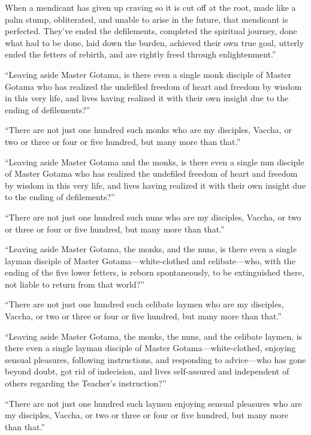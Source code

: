 \documentclass[12pt,openany]{book}%
\begin{document}
When a mendicant has given up craving so it is cut off at the root, made like a palm stump, obliterated, and unable to arise in the future, that mendicant is perfected. They’ve ended the defilements, completed the spiritual journey, done what had to be done, laid down the burden, achieved their own true goal, utterly ended the fetters of rebirth, and are rightly freed through enlightenment.” 

“Leaving aside Master Gotama, is there even a single monk disciple of Master Gotama who has realized the undefiled freedom of heart and freedom by wisdom in this very life, and lives having realized it with their own insight due to the ending of defilements?” 

“There are not just one hundred such monks who are my disciples, Vaccha, or two or three or four or five hundred, but many more than that.” 

“Leaving aside Master Gotama and the monks, is there even a single nun disciple of Master Gotama who has realized the undefiled freedom of heart and freedom by wisdom in this very life, and lives having realized it with their own insight due to the ending of defilements?” 

“There are not just one hundred such nuns who are my disciples, Vaccha, or two or three or four or five hundred, but many more than that.” 

“Leaving aside Master Gotama, the monks, and the nuns, is there even a single layman disciple of Master Gotama—white-clothed and celibate—who, with the ending of the five lower fetters, is reborn spontaneously, to be extinguished there, not liable to return from that world?” 

“There are not just one hundred such celibate laymen who are my disciples, Vaccha, or two or three or four or five hundred, but many more than that.” 

“Leaving aside Master Gotama, the monks, the nuns, and the celibate laymen, is there even a single layman disciple of Master Gotama—white-clothed, enjoying sensual pleasures, following instructions, and responding to advice—who has gone beyond doubt, got rid of indecision, and lives self-assured and independent of others regarding the Teacher’s instruction?” 

“There are not just one hundred such laymen enjoying sensual pleasures who are my disciples, Vaccha, or two or three or four or five hundred, but many more than that.” 
\end{document}
